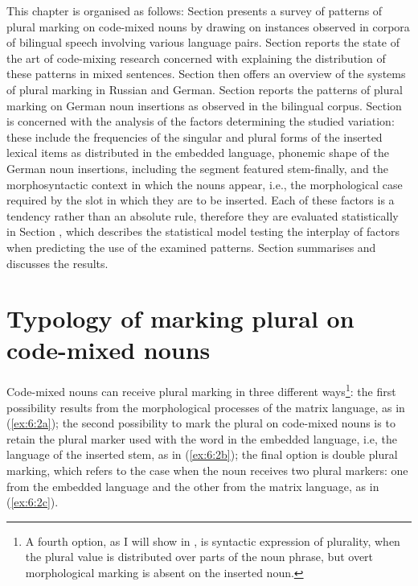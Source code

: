 This chapter is organised as follows: Section  presents a survey of patterns of plural marking on code-mixed nouns by drawing on instances observed in corpora of bilingual speech involving various language pairs. Section  reports the state of the art of code-mixing research concerned with explaining the distribution of these patterns in mixed sentences. Section  then offers an overview of the systems of plural marking in Russian and German. Section  reports the patterns of plural marking on German noun insertions as observed in the bilingual corpus. Section  is concerned with the analysis of the factors determining the studied variation: these include the frequencies of the singular and plural forms of the inserted lexical items as distributed in the embedded language, phonemic shape of the German noun insertions, including the segment featured stem-finally, and the morphosyntactic context in which the nouns appear, i.e., the morphological case required by the slot in which they are to be inserted. Each of these factors is a tendency rather than an absolute rule, therefore they are evaluated statistically in Section , which describes the statistical model testing the interplay of factors when predicting the use of the examined patterns. Section  summarises and discusses the results.

\section{Typology of marking plural on code-mixed nouns}\label{sec:plural typology}

Code-mixed nouns can receive plural marking in three different ways\footnote{A fourth option, as I will show in , is syntactic expression of plurality, when the plural value is distributed over parts of the noun phrase, but overt morphological marking is absent on the inserted noun.}: the first possibility  results from the morphological processes of the matrix language, as in (\ref{ex:6:2a}); the second possibility to mark the plural on code-mixed nouns is to retain the plural marker used with the word in the embedded language, i.e, the language of the inserted stem, as in (\ref{ex:6:2b}); the final option is double plural marking, which refers to the case when the noun receives two plural markers: one from the embedded language and the other from the matrix language, as in (\ref{ex:6:2c}).

